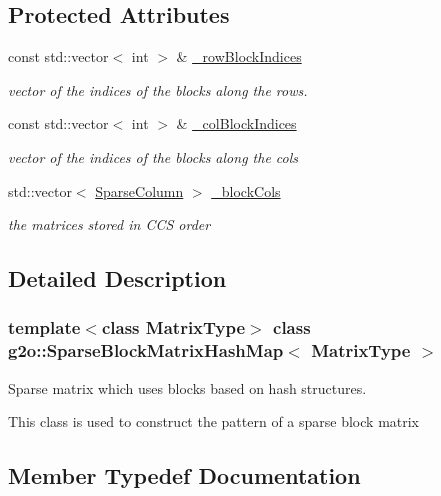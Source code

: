 \subsection*{Protected Attributes}
\begin{DoxyCompactItemize}
\item 
const std\+::vector$<$ int $>$ \& \mbox{\hyperlink{classg2o_1_1_sparse_block_matrix_hash_map_ab002c32872fbce7d3485a5032eaee0de}{\+\_\+row\+Block\+Indices}}
\begin{DoxyCompactList}\small\item\em vector of the indices of the blocks along the rows. \end{DoxyCompactList}\item 
const std\+::vector$<$ int $>$ \& \mbox{\hyperlink{classg2o_1_1_sparse_block_matrix_hash_map_a1def3b2ef5c5ee646d831cda7b1954be}{\+\_\+col\+Block\+Indices}}
\begin{DoxyCompactList}\small\item\em vector of the indices of the blocks along the cols \end{DoxyCompactList}\item 
std\+::vector$<$ \mbox{\hyperlink{classg2o_1_1_sparse_block_matrix_hash_map_ae364a722296b90e32dd6c3a8fbeb49ae}{Sparse\+Column}} $>$ \mbox{\hyperlink{classg2o_1_1_sparse_block_matrix_hash_map_ae54514ce47f9cf1e54455d1f0adceb23}{\+\_\+block\+Cols}}
\begin{DoxyCompactList}\small\item\em the matrices stored in C\+CS order \end{DoxyCompactList}\end{DoxyCompactItemize}


\subsection{Detailed Description}
\subsubsection*{template$<$class Matrix\+Type$>$\newline
class g2o\+::\+Sparse\+Block\+Matrix\+Hash\+Map$<$ Matrix\+Type $>$}

Sparse matrix which uses blocks based on hash structures. 

This class is used to construct the pattern of a sparse block matrix 

\subsection{Member Typedef Documentation}
\mbox{\label{classg2o_1_1_sparse_block_matrix_hash_map_ae364a722296b90e32dd6c3a8fbeb49ae}} 
